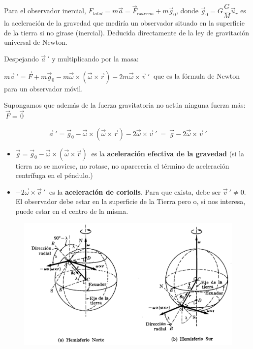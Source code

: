Para el observador inercial, $F_{total}=m\vec a= \vec F_{externa}+m\vec g_0$, donde $\vec g_0= G\dfrac G M \vec u_r$ es la aceleración de la gravedad que mediría un observador situado en la superficie de la tierra si no girase (inercial). \textcolor{gris}{Deducida directamente de la ley de gravitación universal de Newton.}

Despejando $\vec a\ '$ y multiplicando por la masa:

$m\vec a\ '=\vec F + m\vec g_0-m\vec \omega \times (\vec \omega \times \vec r)-2m\vec \omega \times \vec v \ '\ $ que es la fórmula de Newton para un observador móvil.

Supongamos que además de la fuerza gravitatoria no actúa ninguna fuerza más: $\ \vec F = \vec 0$

$$\vec a\ '= \vec g_0- \vec \omega \times (\vec \omega \times \vec r)-2\vec \omega \times \vec v \ ' \ = \ \vec g -2\vec \omega \times \vec v\ '$$

\begin{itemize}
\item $\vec g =\vec g_0- \vec \omega \times (\vec \omega \times \vec r) \ $ es la \textbf{aceleración efectiva de la gravedad} (si la tierra no se moviese, no rotase, no aparecería el término de aceleración centrífuga en el péndulo.)
\item $-2\vec \omega \times \vec v\ ' \ $ es la \textbf{aceleración de coriolis}. Para que exista, debe ser $\vec v\ ' \neq 0$. El observador debe estar en la superficie de la Tierra pero o, si nos interesa, puede estar en el centro de la misma.
\end{itemize}

\begin{figure}[H]
	\centering
	\includegraphics[width=1.05\textwidth]{imagenes/imagenes11/T11IM01.png}
\end{figure}

